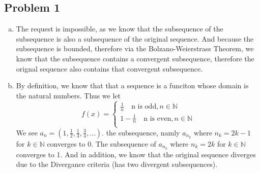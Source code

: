 \documentclass[12pt]{article}
\begin{document}
\subsection*{Problem 1}
\begin{enumerate}[a).]
    \item {
    The request is impossible, as we know that the subsequence of the subsequence is also a subsequence of the original sequence. 
    And because the subsequence is bounded, therefore via the Bolzano-Weierstrass Theorem, we know that the subsequence contains a convergent subsequence, therefore the orignal sequence also contains that convergent subsequence.
    }
    \item {
    By definition, we know that that a sequence is a funciton whose domain is the natural numbers.
    Thus we let 
        $$ 
        f(x) = \left\{ 
            \begin{array}{ll} 
                \frac{1}{n} \quad \text{n is odd}, n \in \mathbb{N}\\
                1 - \frac{1}{n} \quad \text{n is even}, n \in \mathbb{N} \\
            \end{array} \right.
        $$
    We see $a_n = (1,\frac{1}{2},\frac{1}{3}, \frac{3}{4}, \dots)$.
    the subsequence, namly $a_{n_k}$ where $n_k = 2k - 1$ for $k \in \mathbb{N}$ converges to 0.
    The subsequence of $a_{n_k}$ where $n_k = 2k $ for $k \in \mathbb{N}$ converges to 1. 
    And in addition, we know that the original sequence diverges due to the Divergance criteria (has two divergent subsequences). 
    }
\end{enumerate}
\end{document}
